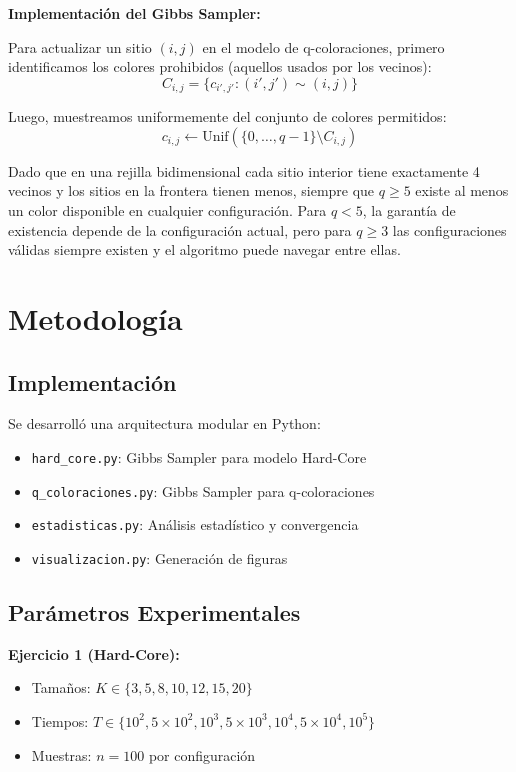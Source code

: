 \textbf{Implementación del Gibbs Sampler:}

Para actualizar un sitio $(i,j)$ en el modelo de q-coloraciones, primero identificamos los colores prohibidos (aquellos usados por los vecinos):
\begin{equation}
C_{i,j} = \{c_{i',j'} : (i',j') \sim (i,j)\}
\end{equation}

Luego, muestreamos uniformemente del conjunto de colores permitidos:
\begin{equation}
c_{i,j} \leftarrow \text{Unif}(\{0, \ldots, q-1\} \setminus C_{i,j})
\end{equation}

Dado que en una rejilla bidimensional cada sitio interior tiene exactamente 4 vecinos y los sitios en la frontera tienen menos, siempre que $q \geq 5$ existe al menos un color disponible en cualquier configuración. Para $q < 5$, la garantía de existencia depende de la configuración actual, pero para $q \geq 3$ las configuraciones válidas siempre existen y el algoritmo puede navegar entre ellas.

\clearpage
\section{Metodología}

\subsection{Implementación}

Se desarrolló una arquitectura modular en Python:
\begin{itemize}
    \item \texttt{hard\_core.py}: Gibbs Sampler para modelo Hard-Core
    \item \texttt{q\_coloraciones.py}: Gibbs Sampler para q-coloraciones
    \item \texttt{estadisticas.py}: Análisis estadístico y convergencia
    \item \texttt{visualizacion.py}: Generación de figuras
\end{itemize}

\subsection{Parámetros Experimentales}

\textbf{Ejercicio 1 (Hard-Core):}
\begin{itemize}
    \item Tamaños: $K \in \{3, 5, 8, 10, 12, 15, 20\}$
    \item Tiempos: $T \in \{10^2, 5 \times 10^2, 10^3, 5 \times 10^3, 10^4, 5 \times 10^4, 10^5\}$
    \item Muestras: $n = 100$ por configuración
\end{itemize}

